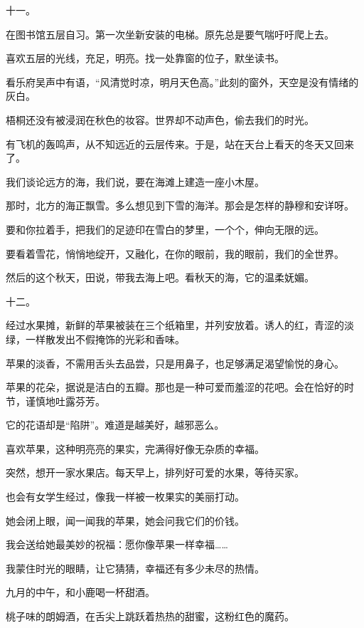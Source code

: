\documentclass[12pt,a4paper]{article}
\newcommand{\subpart}[1]{
	\begingroup \par
	\vspace{1ex} \centering #1
	\par \endgroup
}
\begin{document}
		\subpart{十一。}

		在图书馆五层自习。第一次坐新安装的电梯。原先总是要气喘吁吁爬上去。\par
		喜欢五层的光线，充足，明亮。找一处靠窗的位子，默坐读书。\par
		看乐府吴声中有语，“风清觉时凉，明月天色高。”此刻的窗外，天空是没有情绪的灰白。\par
		梧桐还没有被浸润在秋色的妆容。世界却不动声色，偷去我们的时光。\par
		有飞机的轰鸣声，从不知远近的云层传来。于是，站在天台上看天的冬天又回来了。\par
		我们谈论远方的海，我们说，要在海滩上建造一座小木屋。\par
		那时，北方的海正飘雪。多么想见到下雪的海洋。那会是怎样的静穆和安详呀。\par
		要和你拉着手，把我们的足迹印在雪白的梦里，一个个，伸向无限的远。\par
		要看着雪花，悄悄地绽开，又融化，在你的眼前，我的眼前，我们的全世界。\par
		然后的这个秋天，田说，带我去海上吧。看秋天的海，它的温柔妩媚。

		\subpart{十二。}

		经过水果摊，新鲜的苹果被装在三个纸箱里，并列安放着。诱人的红，青涩的淡绿，一样散发出不假掩饰的光彩和香味。\par
		苹果的淡香，不需用舌头去品尝，只是用鼻子，也足够满足渴望愉悦的身心。\par
		苹果的花朵，据说是洁白的五瓣。那也是一种可爱而羞涩的花吧。会在恰好的时节，谨慎地吐露芬芳。\par
		它的花语却是“陷阱”。难道是越美好，越邪恶么。\par
		喜欢苹果，这种明亮亮的果实，完满得好像无杂质的幸福。\par
		突然，想开一家水果店。每天早上，排列好可爱的水果，等待买家。\par
		也会有女学生经过，像我一样被一枚果实的美丽打动。\par
		她会闭上眼，闻一闻我的苹果，她会问我它们的价钱。\par
		我会送给她最美妙的祝福：愿你像苹果一样幸福……

	\endwriting



		我蒙住时光的眼睛，让它猜猜，幸福还有多少未尽的热情。

		九月的中午，和小鹿喝一杯甜酒。

		桃子味的朗姆酒，在舌尖上跳跃着热热的甜蜜，这粉红色的魔药。
\end{document}
